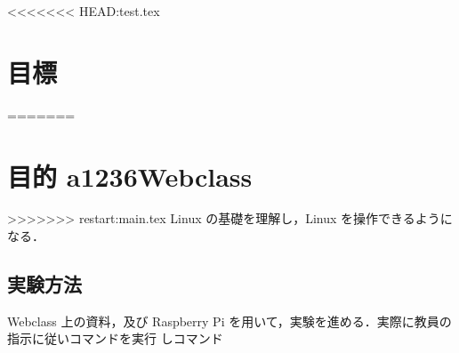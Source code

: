 \documentclass{myreport}  %
\begin{document}
<<<<<<< HEAD:test.tex

\section{目標}
=======
\section{目的 a1236Webclass}
>>>>>>> restart:main.tex
Linux の基礎を理解し，Linux を操作できるようになる．

\subsection{実験方法}
Webclass 上の資料，及び Raspberry Pi を用いて，実験を進める．実際に教員の指示に従いコマンドを実行
しコマンド
\end{document}
